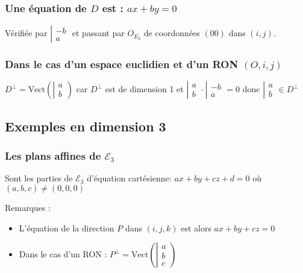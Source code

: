 \documentclass[12pt,a4paper,french]{book}
\begin{document}
			\subsubsection{Une équation de $D$ est : $ax+by=0$}
				Vérifiée par $\left| \begin{array}{ll} -b\\a \end{array}\right.$ et passant par $O_{E_2}$ de coordonnées $(0 0)$ dans $(i,j)$.
			\subsubsection{Dans le cas d'un espace euclidien et d'un RON $(O,i,j)$}
				$D^{\perp} = \mbox{Vect}(\left| \begin{array}{ll} a\\b \end{array}\right.)$ car $D^{\perp}$ est de dimension 1 et $\left| \begin{array}{ll} a\\b \end{array}\right. \cdot \left| \begin{array}{ll} -b\\a \end{array}\right.  = 0$ donc $\left| \begin{array}{ll} a\\b \end{array}\right. \in  D^{\perp}$
		\subsection{Exemples en dimension 3}
			\subsubsection{Les plans affines de $\mathcal{E}_3$}
				Sont les parties de $\mathcal{E}_3$ d'équation cartésienne: $ax+by+cz+d=0$ où $(a,b,c) \neq (0,0,0)$
				
				Remarques :
				\begin{itemize}
					\item L'équation de la direction $P$ dans $(i,j,k)$ est alors $ax + by + cz = 0$
					\item Dans le cas d'un RON : $P^{\perp} = \mbox{Vect}(\left| \begin{array}{ll} a\\b\\c \end{array}\right.)$
				\end{itemize}
\end{document}
